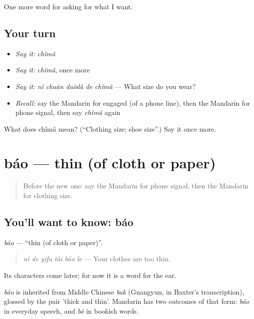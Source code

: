 \begin{grammarlens}[title={What you've built}]
One more word for asking for what I want.
\end{grammarlens}

\subsection*{Your turn}
\begin{itemize}
\raggedright
  \item \emph{Say it:} \emph{chǐmǎ}
  \item \emph{Say it:} \emph{chǐmǎ}, once more
  \item \emph{Say it:} \emph{nǐ chuān duōdà de chǐmǎ} — What size do you wear?
  \item \emph{Recall:} say the Mandarin for engaged (of a phone line), then the Mandarin for phone signal, then say \emph{chǐmǎ} again
\end{itemize}

\begin{tcolorbox}[breakable,colback=teal!4,colframe=teal!35!black,title={Before you move on}]
What does chǐmǎ mean? (\textquotedblleft{}Clothing size; shoe size\textquotedblright{}.) Say it once more.
\end{tcolorbox}
\section[báo]{báo — thin (of cloth or paper)}

\label{lesson:ZH-C199-bao}



\begin{quote}
Before the new one: say the Mandarin for phone signal, then the Mandarin for clothing size.
\end{quote}

\subsection*{You'll want to know: báo}
\emph{báo} — \textquotedblleft{}thin (of cloth or paper)\textquotedblright{}.

\begin{quote}
\emph{nǐ de yīfu tài báo le} — Your clothes are too thin.
\end{quote}

Its characters come later; for now it is a word for the ear.

\begin{cousinweb}
\emph{báo} is inherited from Middle Chinese \emph{bak} (Guangyun, in Baxter's transcription), glossed by the pair 'thick and thin'. Mandarin has two outcomes of that form: \emph{báo} in everyday speech, and \emph{bó} in bookish words.
\end{cousinweb}

